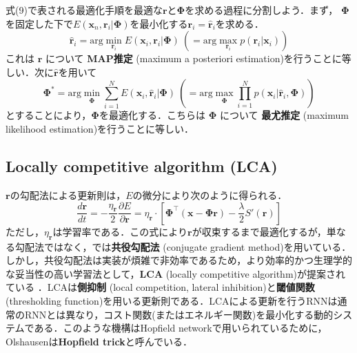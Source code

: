 式(9)で表される最適化手順を最適な$\mathbf{r}$と$\mathbf{\Phi}$を求める過程に分割しよう．まず， $\mathbf{\Phi}$を固定した下で$E(\mathbf{x}_n, \mathbf{r}_i|\mathbf{\Phi})$を最小化する$\mathbf{r}_i=\hat{\mathbf{r}}_i$を求める．
\begin{equation}
\hat{\mathbf{r}}_i=\text{arg}\min_{\mathbf{r}_i}E(\mathbf{x}_i, \mathbf{r}_i|\mathbf{\Phi})\ \left(= \text{arg}\max_{\mathbf{r}_i}p(\mathbf{r}_i|\mathbf{x}_i)\right)
\end{equation}
これは $\mathbf{r}$ について \textbf{MAP推定} (maximum a posteriori estimation)を行うことに等しい．次に$\hat{\mathbf{r}}$を用いて
\begin{equation}
\mathbf{\Phi}^*=\text{arg}\min_{\mathbf{\Phi}} \sum_{i=1}^N E(\mathbf{x}_i, \hat{\mathbf{r}}_i|\mathbf{\Phi})\ \left(= \text{arg}\max_{\mathbf{\Phi}} \prod_{i=1}^N p(\mathbf{x}_i|\hat{\mathbf{r}}_i, \mathbf{\Phi})\right)
\end{equation}
とすることにより，$\mathbf{\Phi}$を最適化する．こちらは $\mathbf{\Phi}$ について \textbf{最尤推定} (maximum likelihood estimation)を行うことに等しい．
\subsection{ Locally competitive algorithm (LCA) }
$\mathbf{r}$の勾配法による更新則は，$E$の微分により次のように得られる．
\begin{equation}
\frac{d \mathbf{r}}{dt}= -\frac{\eta_\mathbf{r}}{2}\frac{\partial E}{\partial \mathbf{r}}=\eta_\mathbf{r} \cdot\left[\mathbf{\Phi}^\top (\mathbf{x}-\mathbf{\Phi}\mathbf{r})- \frac{\lambda}{2}S'\left(\mathbf{r}\right)\right]
\end{equation}
ただし，$\eta_{\mathbf{r}}$は学習率である．この式により$\mathbf{r}$が収束するまで最適化するが，単なる勾配法ではなく，\citep{Olshausen1996-xe}では\textbf{共役勾配法} (conjugate gradient method)を用いている．しかし，共役勾配法は実装が煩雑で非効率であるため，より効率的かつ生理学的な妥当性の高い学習法として，\textbf{LCA}  (locally competitive algorithm)が提案されている \citep{Rozell2008-wp}．LCAは\textbf{側抑制} (local competition, lateral inhibition)と\textbf{閾値関数} (thresholding function)を用いる更新則である．LCAによる更新を行うRNNは通常のRNNとは異なり，コスト関数(またはエネルギー関数)を最小化する動的システムである．このような機構はHopfield networkで用いられているために，Olshausenは\textbf{Hopfield trick}と呼んでいる．
